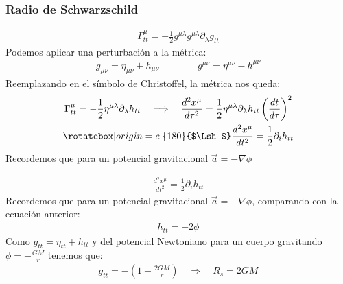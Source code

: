 \documentclass{beamer}
\begin{document}
\begin{frame}
\frametitle{Radio de Schwarzschild}
\begin{align*}
  \Gamma _{tt } ^ {\mu } = - \frac{1}{2} g ^ {\mu\lambda} g ^{\mu\lambda} \partial_\lambda g _{tt} 
\end{align*}
Podemos aplicar una perturbación a la métrica: 
\begin{gather*}
  g _{\mu \nu} = \eta _{\mu\nu}  + h _{\mu\nu} \qquad \qquad g ^ {\mu\nu} = \eta ^ {\mu\nu} - h ^ {\mu\nu}
\end{gather*}
Reemplazando en el símbolo de Christoffel, la métrica nos queda: 
\begin{gather*}
  \Gamma _{tt } ^ {\mu} = - \frac{1}{2} \eta ^ {\mu\lambda} \partial _{\lambda} h _{tt } \quad \Longrightarrow \quad \frac{d ^2 x ^ {\mu} }{d \tau^2 } = \frac{1}{2} \eta ^ {\mu\lambda} \partial_\lambda h _{tt } \left(\frac{d t  }{d \tau }\right)^2  \\
  \rotatebox[origin=c]{180}{$\Lsh$} \frac{d ^2 x ^ {\mu} }{d t^2 } = \frac{1}{2} \partial _{i }  h _{tt } 
\end{gather*}
Recordemos que para un potencial gravitacional $ \vec a = -\nabla  \phi $
\end{frame}




\begin{frame}
\begin{gather*}
\frac{d ^2 x ^ {\mu} }{d t^2 } = \frac{1}{2} \partial _{i }  h _{tt }
\end{gather*}
Recordemos que para un potencial gravitacional $ \vec a = -\nabla  \phi $, comparando con la ecuación anterior: 
\begin{gather*}
  h _{tt } = -2\phi 
\end{gather*}
Como $ g _{tt } = \eta _{tt } + h _{tt }  $ y del potencial Newtoniano para un cuerpo gravitando $ \phi = - \frac{GM }{r } $ tenemos que: 
\begin{gather*}
  g _{tt } = - \left(1 - \frac{2GM }{r }\right) \quad \Longrightarrow \quad R_s = 2GM
\end{gather*}
\end{frame}


\end{document}
